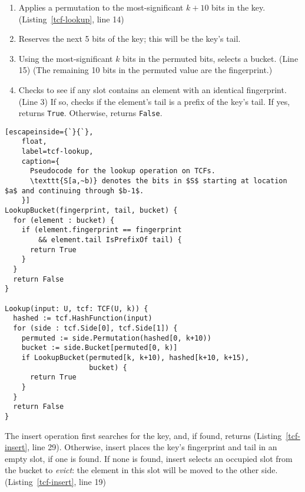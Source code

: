 \documentclass[sigconf, nonacm]{acmart}
\begin{document}
\begin{enumerate}
\item Applies a permutation to the most-significant $k+10$ bits in the key. (Listing~\ref{tcf-lookup}, line 14)
\item Reserves the next 5 bits of the key; this will be the key's tail.
\item Using the most-significant $k$ bits in the permuted bits, selects a bucket. (Line 15)
(The remaining 10 bits in the permuted value are the fingerprint.)
\item Checks to see if any slot contains an element with an identical fingerprint. (Line 3)
If so, checks if the element's tail is a prefix of the key's tail.
If yes, returns \verb|True|.
Otherwise, returns \verb|False|.
\end{enumerate}


\begin{lstlisting}[escapeinside={`}{`},
    float,
    label=tcf-lookup,
    caption={
      Pseudocode for the lookup operation on TCFs.
      \texttt{S[a,~b)} denotes the bits in $S$ starting at location $a$ and continuing through $b-1$.
    }]
LookupBucket(fingerprint, tail, bucket) {
  for (element : bucket) {
    if (element.fingerprint == fingerprint
        && element.tail IsPrefixOf tail) {
      return True
    }
  }
  return False
}

Lookup(input: U, tcf: TCF(U, k)) {
  hashed := tcf.HashFunction(input)
  for (side : tcf.Side[0], tcf.Side[1]) {
    permuted := side.Permutation(hashed[0, k+10))
    bucket := side.Bucket[permuted[0, k)]
    if LookupBucket(permuted[k, k+10), hashed[k+10, k+15),
                    bucket) {
      return True
    }
  }
  return False
}
\end{lstlisting}


The insert operation first searches for the key, and, if found, returns (Listing~\ref{tcf-insert}, line 29).
Otherwise, insert places the key's fingerprint and tail in an empty slot, if one is found.
If none is found, insert selects an occupied slot from the bucket to {\em evict}: the element in this slot will be moved to the other side. (Listing~\ref{tcf-insert}, line 19)
\end{document}
